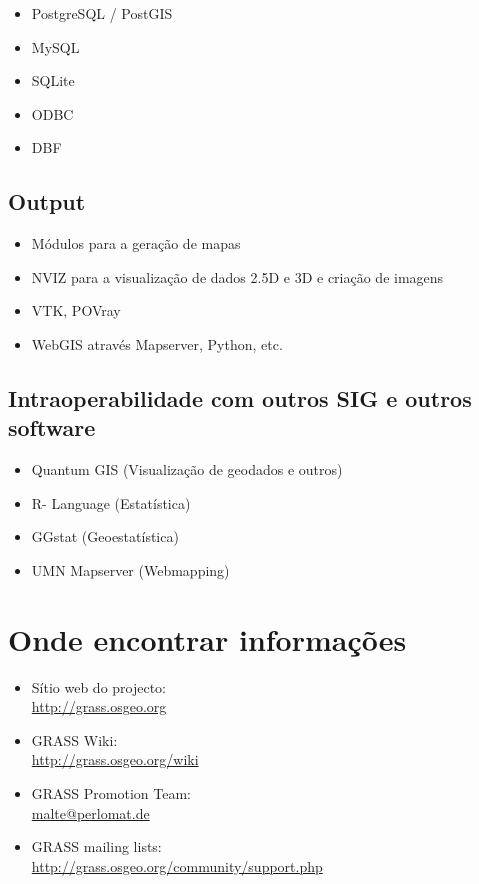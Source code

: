 \documentclass[notumble,a4paper,10pt,nofoldmark]{leaflet}
\newcommand{\GRASSurl}{\url{http://grass.osgeo.org}}
\begin{document}
\begin{itemize}
\item PostgreSQL / PostGIS
\item MySQL
\item SQLite
\item ODBC
\item DBF
\end{itemize}

\subsection{Output}

\begin{itemize}
\item M\'{o}dulos para a gera\c{c}\~{a}o de mapas
\item NVIZ para a visualiza\c{c}\~{a}o de dados 2.5D e 3D e cria\c{c}\~{a}o de imagens
\item VTK, POVray
\item WebGIS atrav\'{e}s Mapserver, Python, etc. 
\end{itemize}

\subsection{Intraoperabilidade com outros SIG e outros software}

\begin{itemize}
\item Quantum GIS (Visualiza\c{c}\~{a}o de geodados e outros)
\item R- Language (Estat\'{i}stica)
\item GGstat (Geoestat\'{i}stica)
\item UMN Mapserver (Webmapping)
\end{itemize}

\section{Onde encontrar informa\c{c}\~{o}es}

\begin{itemize}
\item{S\'{i}tio web do projecto: \\\GRASSurl}
\item{GRASS Wiki: \\\url{http://grass.osgeo.org/wiki}}
\item{GRASS Promotion Team: \\\url{malte@perlomat.de}}
\item{GRASS mailing lists: \\\url{http://grass.osgeo.org/community/support.php}}
\end{itemize}
\end{document}
